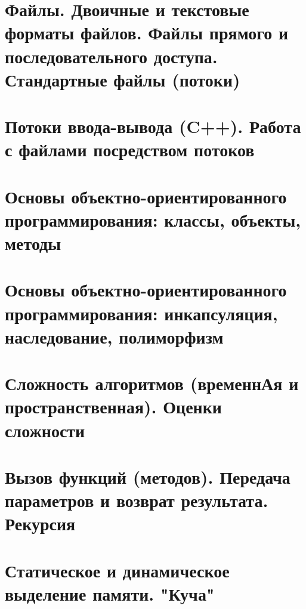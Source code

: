 \section{Файлы. Двоичные и текстовые форматы файлов. Файлы прямого и последовательного доступа. Стандартные файлы (потоки)}
\section{Потоки ввода-вывода (C++). Работа с файлами посредством потоков}
\section{Основы объектно-ориентированного программирования: классы, объекты, методы}
\section{Основы объектно-ориентированного программирования: инкапсуляция, наследование, полиморфизм}
\section{Сложность алгоритмов (временнАя и пространственная). Оценки сложности}
\section{Вызов функций (методов). Передача параметров и возврат результата. Рекурсия}
\section{Статическое и динамическое выделение памяти. "Куча"}
